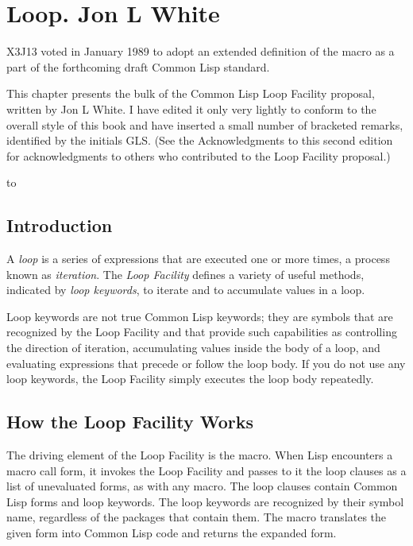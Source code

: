 
\clearpage\def\pagestatus{FINAL PROOF}

\chapter{Loop. Jon L White}
\label{LOOP}

\begin{new}
\prefaceword
X3J13 voted in January 1989
to adopt an extended definition of the  macro
as a part of the forthcoming draft Common Lisp standard.
\end{new}
This chapter presents the bulk of the Common Lisp
Loop Facility proposal, written by Jon L White.  I have
edited it only very lightly
to conform to the overall style of this book and have inserted a small
number of bracketed remarks, identified by the initials GLS.
(See the Acknowledgments to this second edition for
acknowledgments to others who contributed to the Loop Facility proposal.)

\noindent\hbox to \textwidth{\hss---Guy L. Steele Jr.}

\section{Introduction}

A {\it loop\/} is a series of expressions that are executed one or more times,
a process known as {\it iteration}.
The {\it Loop Facility\/} defines a
variety of useful methods, indicated by
{\it loop keywords}, to iterate and to
accumulate values in a loop.


Loop keywords are not true Common Lisp keywords; they are symbols that
are recognized by the Loop Facility and that provide such capabilities
as controlling the direction of iteration, accumulating values inside
the body of a loop, and evaluating expressions that precede or follow
the loop body.  If you do not use any loop keywords, the Loop Facility
simply executes the loop body repeatedly.


\section{How the Loop Facility Works}

The driving element of the Loop Facility is the  macro.
When Lisp encounters a  macro call
form, it invokes the Loop Facility and passes to it the loop clauses
as a list of unevaluated forms, as with any macro.
The loop clauses contain Common Lisp forms and loop keywords.  The
loop keywords are recognized by their symbol name, regardless of the
packages that contain them.  The  macro translates the
given form into Common Lisp code and returns the expanded form.

